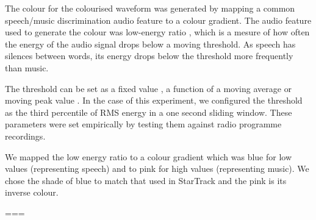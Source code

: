 The colour for the colourised waveform was generated by mapping a common speech/music discrimination audio feature to a
colour gradient. The audio feature used to generate the colour was low-energy ratio \citep{Panagiotakis2005}, which is
a mesure of how often the energy of the audio signal drops below a moving threshold. As speech has silences between
words, its energy drops below the threshold more frequently than music.

The threshold can be set as a fixed value \citep{Liang2005}, a function of a moving average \citep{Ericsson2009} or
moving peak value \citep{Saunders1996}.  In the case of this experiment, we configured the threshold as the third
percentile of RMS energy in a one second sliding window. These parameters were set empirically by testing them against
radio programme recordings.

We mapped the low energy ratio to a colour gradient which was blue for low values (representing speech) and to pink
for high values (representing music). We chose the shade of blue to match that used in StarTrack and the pink is
its inverse colour.

===








